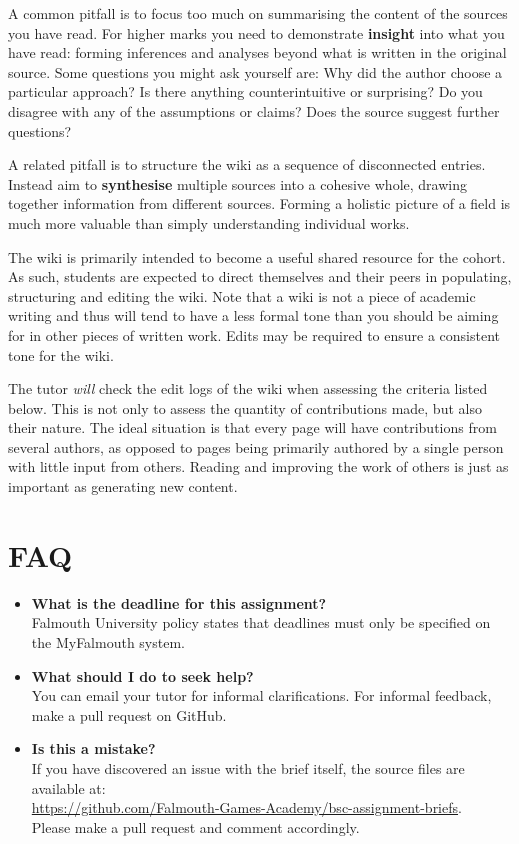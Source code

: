 \documentclass{../../fal_assignment}
\begin{document}
A common pitfall is to focus too much on summarising the content of the sources you have read.
For higher marks you need to demonstrate \textbf{insight} into what you have read:
forming inferences and analyses beyond what is written in the original source.
Some questions you might ask yourself are:
Why did the author choose a particular approach?
Is there anything counterintuitive or surprising?
Do you disagree with any of the assumptions or claims?
Does the source suggest further questions?

A related pitfall is to structure the wiki as a sequence of disconnected entries.
Instead aim to \textbf{synthesise} multiple sources into a cohesive whole,
drawing together information from different sources.
Forming a holistic picture of a field is much more valuable than simply understanding individual works.

The wiki is primarily intended to become a useful shared resource for the cohort.
As such, students are expected to direct themselves and their peers in populating, structuring and editing the wiki.
Note that a wiki is not a piece of academic writing
and thus will tend to have a less formal tone than you should be aiming for in other pieces of written work.
Edits may be required to ensure a consistent tone for the wiki.

The tutor \emph{will} check the edit logs of the wiki when assessing the criteria listed below.
This is not only to assess the quantity of contributions made,
but also their nature.
The ideal situation is that every page will have contributions from several authors,
as opposed to pages being primarily authored by a single person with little input from others.
Reading and improving the work of others is just as important as generating new content.

\section*{FAQ}

\begin{itemize}
	\item 	\textbf{What is the deadline for this assignment?} \\ 
    		Falmouth University policy states that deadlines must only be specified on the MyFalmouth system.
    		
	\item 	\textbf{What should I do to seek help?} \\ 
    		You can email your tutor for informal clarifications. For informal feedback, make a pull request on GitHub. 
    		
    	\item 	\textbf{Is this a mistake?} \\ 	
    		If you have discovered an issue with the brief itself, the source files are available at: \\
    		\url{https://github.com/Falmouth-Games-Academy/bsc-assignment-briefs}.\\
    		 Please make a pull request and comment accordingly.
\end{itemize}
\end{document}
